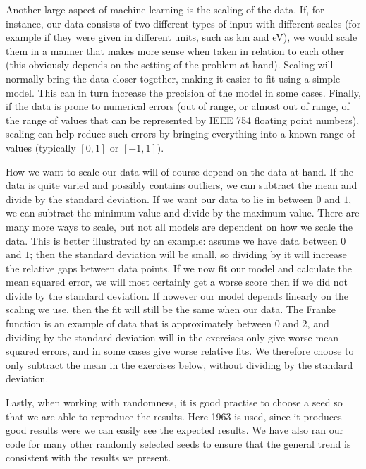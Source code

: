 \documentclass[10pt, a4paper]{article}
\begin{document}
    Another large aspect of machine learning is the scaling of the data. If, for instance, our data consists of two different types of input with different scales (for example if they were given in different units, such as km and eV), we would scale them in a manner that makes more sense when taken in relation to each other (this obviously depends on the setting of the problem at hand). Scaling will normally bring the data closer together, making it easier to fit using a simple model. This can in turn increase the precision of the model in some cases. Finally, if the data is prone to numerical errors (out of range, or almost out of range, of the range of values that can be represented by IEEE 754 floating point numbers), scaling can help reduce such errors by bringing everything into a known range of values (typically $[0, 1]$ or $[-1, 1]$).
    
    How we want to scale our data will of course depend on the data at hand. If the data is quite varied and possibly contains outliers, we can subtract the mean and divide by the standard deviation. If we want our data to lie in between $0$ and $1$, we can subtract the minimum value and divide by the maximum value. There are many more ways to scale, but not all models are dependent on how we scale the data. This is better illustrated by an example: assume we have data between $0$ and $1$; then the standard deviation will be small, so dividing by it will increase the relative gaps between data points. If we now fit our model and calculate the mean squared error, we will most certainly get a worse score then if we did not divide by the standard deviation. If however our model depends linearly on the scaling we use, then the fit will still be the same when  our data. The Franke function is an example of data that is approximately between $0$ and $2$, and dividing by the standard deviation will in the exercises only give worse mean squared errors, and in some cases give worse relative fits. We therefore choose to only subtract the mean in the exercises below, without dividing by the standard deviation.
    
    Lastly, when working with randomness, it is good practise to choose a seed so that we are able to reproduce the results. Here 1963 is used, since it produces good results were we can easily see the expected results. We have also ran our code for many other randomly selected seeds to ensure that the general trend is consistent with the results we present.
    
\end{document}
